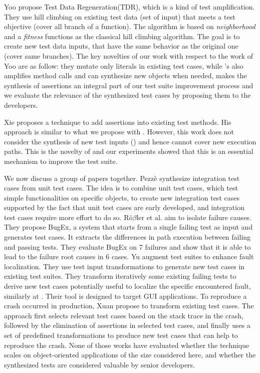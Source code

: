 Yoo \etal  \cite{Yoo:2012:TDR:2237756.2237758} propose Test Data Regeneration(TDR), which is a kind of test amplification. They use hill climbing on existing test data (set of input) that meets a test objective (\eg cover all branch of a function). The algorithm is based on \emph{neighborhood} and a \emph{fitness} functions as the classical hill climbing algorithm. The goal is to create new test data inputs, that have the same behavior as the original one (\eg cover same branches). 
The key novelties of our work with respect to the work of Yoo \etal \cite{Yoo:2012:TDR:2237756.2237758} are as follow: they mutate only literals in existing test cases, while \dspot's \Iampl also amplifies method calls and can synthesize new objects when needed, \Aampl{} makes the synthesis of assertions an integral part of our test suite improvement process and we evaluate the relevance of the synthesized test cases by proposing them to the developers.

Xie \cite{Xie2006} proposes a technique to add assertions into existing test methods. His approach is similar to what we propose with \Aampl{}. However, this work does not consider the synthesis of new test inputs (\Iampl) and hence cannot cover new execution paths. This is the novelty of \dspot and our experiments showed that this is an essential mechanism to improve the test suite.


We now discuss a group of papers together. Pezz\`e \etal \cite{Pezze:2013:GEI:2510665.2511580} synthesize integration test cases from unit test cases. The idea is to combine unit test cases, which test simple functionalities on specific objects, to create new integration test cases supported by the fact that unit test cases are early developed, and integration test cases require more effort to do so.
R{\"o}$\beta$ler et al. \cite{robetaler2012isolating} aim to isolate failure causes. They propose BugEx, a system that starts from a single failing test as input and generates test cases. It extracts the differences in path execution between failing and passing tests. They evaluate BugEx on 7 failures and show that it is able to lead to the failure root causes in 6 cases.
Yu \etal \cite{Yu2013} augment test suites to enhance fault localization. They use test input transformations to generate new test cases in existing test suites. They transform iteratively some existing failing tests to derive new test cases potentially useful to localize the specific encountered fault, similarly at \Iampl. Their tool is designed to target GUI applications.
To reproduce a crash occurred in production, Xuan \etal \cite{Xuan:2015:CRV:2786805.2803206} propose to transform existing test cases. The approach first selects relevant test cases based on the stack trace in the crash, followed by the elimination of assertions in selected test cases, and finally uses a set of predefined transformations to produce new test cases that can help to reproduce the crash.
None of those works have evaluated whether the technique scales on object-oriented applications of the size considered here, and whether the synthesized tests are considered valuable by senior developers.


